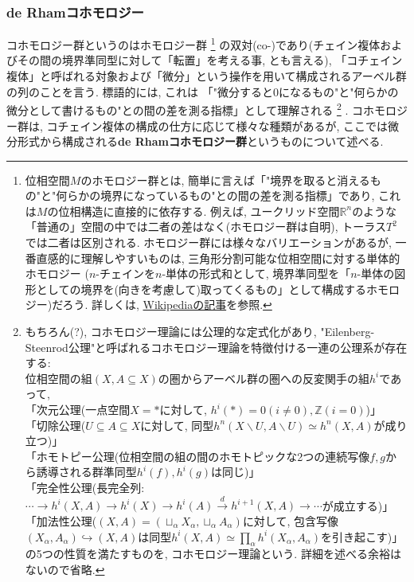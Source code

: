\subsubsection{de Rhamコホモロジー}
コホモロジー群というのはホモロジー群
\footnote{位相空間$M$のホモロジー群とは, 簡単に言えば「"境界を取ると消えるもの"と"何らかの境界になっているもの"との間の差を測る指標」であり, 
これは$M$の位相構造に直接的に依存する. 
例えば, ユークリッド空間$\mathbb{R}^n$のような「普通の」空間の中では二者の差はなく(ホモロジー群は自明), トーラス$T^2$では二者は区別される. 
ホモロジー群には様々なバリエーションがあるが, 一番直感的に理解しやすいものは, 三角形分割可能な位相空間に対する単体的ホモロジー
($n$-チェインを$n$-単体の形式和として, 境界準同型を「$n$-単体の図形としての境界を(向きを考慮して)取ってくるもの」として構成するホモロジー)だろう. 
詳しくは, \href{https://ja.wikipedia.org/wiki/単体的ホモロジー}{Wikipediaの記事}を参照. }
の双対(co-)であり(チェイン複体およびその間の境界準同型に対して「転置」を考える事, とも言える), 
「コチェイン複体」と呼ばれる対象および「微分」という操作を用いて構成されるアーベル群の列のことを言う. 
標語的には, これは
「"微分すると0になるもの"と"何らかの微分として書けるもの"との間の差を測る指標」として理解される
\footnote{もちろん(?), コホモロジー理論には公理的な定式化があり, 
"Eilenberg-Steenrod公理"と呼ばれるコホモロジー理論を特徴付ける一連の公理系が存在する: \\
位相空間の組$(X, A\subseteq X)$の圏からアーベル群の圏への反変関手の組$h^{i}$であって, \\
「次元公理(一点空間$X=*$に対して, $h^i(*)=0(i\neq 0), \mathbb{Z}(i=0)$)」\\
「切除公理($U\subseteq A \subseteq X$に対して, 同型$h^{n}(X\backslash U, A\backslash U)\simeq h^n(X, A)$が成り立つ)」\\
「ホモトピー公理(位相空間の組の間のホモトピックな2つの連続写像$f, g$から誘導される群準同型$h^i(f), h^i(g)$は同じ)」\\
「完全性公理(長完全列: $\cdots\to h^i(X, A)\to h^i(X)\to h^i(A)\stackrel{d}{\to}h^{i+1}(X, A)\to\cdots$が成立する)」\\
「加法性公理($(X, A)=(\sqcup_\alpha X_\alpha, \sqcup_{\alpha}A_\alpha)$に対して, 
包含写像$(X_\alpha, A_\alpha)\hookrightarrow (X, A)$は同型$h^i(X, A)\simeq  \prod_{\alpha}h^{i}(X_\alpha, A_\alpha)$を引き起こす)」\\
の5つの性質を満たすものを, コホモロジー理論という. 
詳細を述べる余裕はないので省略. }
. 
コホモロジー群は, コチェイン複体の構成の仕方に応じて様々な種類があるが, ここでは微分形式から構成される\textbf{de Rhamコホモロジー群}というものについて述べる. \\
